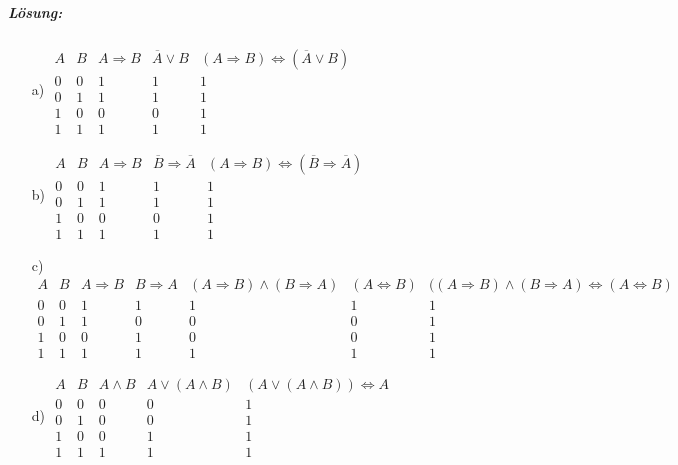 \documentclass[12pt,a4paper,ngerman]{scrartcl}
\begin{document}
	\subparagraph{Lösung:}
	\begin{itemize}
		\item[a)] $\begin{array}{cc|c|c|c}
			A & B & A \Rightarrow B & \overline{A} \vee B & (A \Rightarrow B) \Leftrightarrow (\overline{A} \vee B)\\
			\hline
			0 & 0 & 1 & 1 & 1\\
			0 & 1 & 1 & 1 & 1\\
			1 & 0 & 0 & 0 & 1\\
			1 & 1 & 1 & 1 & 1
		\end{array}$
		
		\item[b)] $\begin{array}{cc|c|c|c}
			A & B & A \Rightarrow B & \overline{B} \Rightarrow \overline{A} & (A \Rightarrow B) \Leftrightarrow (\overline{B} \Rightarrow \overline{A})\\
			\hline
			0 & 0 & 1 & 1 & 1\\
			0 & 1 & 1 & 1 & 1\\
			1 & 0 & 0 & 0 & 1\\
			1 & 1 & 1 & 1 & 1
		\end{array}$
		
		\item[c)]  $\begin{array}{cc|c|c|c|c|c}
			A & B & A \Rightarrow B & B \Rightarrow A & (A \Rightarrow B) \wedge (B \Rightarrow A) & (A \Leftrightarrow B) & ((A \Rightarrow B) \wedge (B \Rightarrow A) \Leftrightarrow (A \Leftrightarrow B)\\
			\hline
			0 & 0 & 1 & 1 & 1 & 1 & 1\\
			0 & 1 & 1 & 0 & 0 & 0 & 1\\
			1 & 0 & 0 & 1 & 0 & 0 & 1\\
			1 & 1 & 1 & 1 & 1 & 1 & 1
		\end{array}$
		
		\item[d)] $\begin{array}{cc|c|c|c}
			A & B & A \wedge B & A \vee (A \wedge B) & (A \vee (A \wedge B)) \Leftrightarrow A\\
			\hline
			0 & 0 & 0 & 0 & 1 \\
			0 & 1 & 0 & 0 & 1 \\
			1 & 0 & 0 & 1 & 1 \\
			1 & 1 & 1 & 1 & 1 
		\end{array}$
	\end{itemize}
	
\end{document}
